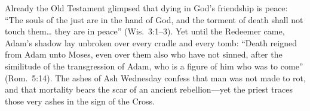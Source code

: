 Already the Old Testament glimpsed that dying in God's friendship is peace: ``The souls of the just are in the hand of God, and the torment of death shall not touch them\ldots{} they are in peace'' (Wis.\ 3:1--3). Yet until the Redeemer came, Adam's shadow lay unbroken over every cradle and every tomb: ``Death reigned from Adam unto Moses, even over them also who have not sinned, after the similitude of the transgression of Adam, who is a figure of him who was to come'' (Rom.\ 5:14). The ashes of Ash Wednesday confess that man was not made to rot, and that mortality bears the scar of an ancient rebellion---yet the priest traces those very ashes in the sign of the Cross.
